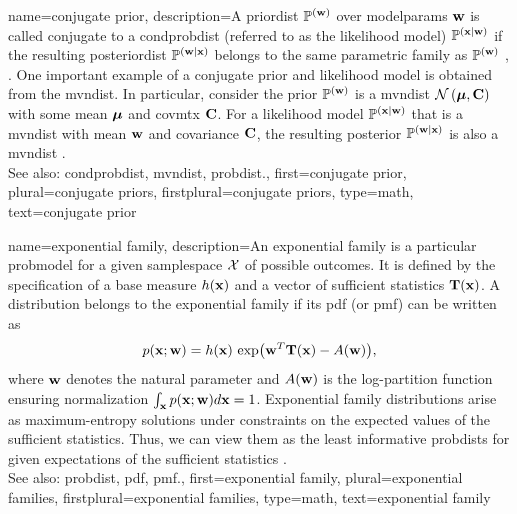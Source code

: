  {name={conjugate prior},
 	description={A \gls{priordist} $\mathbb{P}^{({\bf w})}$ over \glspl{modelparam} 
 		${\bf w}$ is called conjugate to a \gls{condprobdist} (referred to as the 
		likelihood \gls{model}) $\mathbb{P}^{({\bf x}\mid{\bf w})}$ if the resulting 
 		\gls{posteriordist} $\mathbb{P}^{({\bf w} \mid{\bf x})}$ belongs to 
 		the same parametric family as $\mathbb{P}^{({\bf w})}$ \cite{barber2012bayesian}, \cite{BishopBook}. 
 		One important example of a conjugate prior and likelihood \gls{model} is 
 		obtained from the \gls{mvndist}. In particular, consider the prior $\mathbb{P}^{({\bf w})}$ 
 		is a \gls{mvndist} $\mathcal{N}\left({\bm \mu},{\bf C}\right)$ with some 
 		\gls{mean} ${\bm \mu}$ and \gls{covmtx} ${\bf C}$. For a 
 		likelihood \gls{model} $\mathbb{P}^{({\bf x}\mid{\bf w})}$ that is a \gls{mvndist} 
 		with \gls{mean} ${\bf w}$ and \gls{covariance} ${\bf C}$, the resulting \gls{posterior} 
 		$\mathbb{P}^{({\bf w} \mid{\bf x})}$ is also a \gls{mvndist} \cite[Appendix B]{BishopBook}.
		\\
 		See also: \gls{condprobdist}, \gls{mvndist}, \gls{probdist}.},
 	first={conjugate prior},
 	plural={conjugate priors},
 	firstplural={conjugate priors},
 	type=math,
 	text={conjugate prior}
 }

{name={exponential family},
	description={An exponential family is a particular \gls{probmodel} 
		for a given \gls{samplespace} $\mathcal{X}$ of possible \glspl{outcome}. It 
		is defined by the specification of a base \gls{measure} $h({\bf x})$ and 
		a \gls{vector} of sufficient statistics $\mathbf{T}({\bf x})$. 
		A distribution belongs to the exponential family if its \gls{pdf} (or \gls{pmf})
		can be written as 
		\[ p({\bf x} ;  {\bf w}) = h({\bf x})\,\exp\!\big({\bf w}^{T} \mathbf{T}({\bf x}) - A({\bf w})\big),
  		\]
  		where ${\bf w}$ denotes the natural \gls{parameter} and $A({\bf w})$ is the log-partition 
       		\gls{function} ensuring normalization $\int_{{\bf x}} p({\bf x} ;  {\bf w}) d{\bf x} = 1$.
  		Exponential family distributions arise as \gls{maximum}-\gls{entropy} solutions under constraints 
		on the expected values of the sufficient statistics. Thus, we can view them 
		as the least informative \glspl{probdist} for given \glspl{expectation} of the sufficient 
		statistics \cite[Ch. 12]{coverthomas}. 
		\\ 
		See also: \gls{probdist}, \gls{pdf}, \gls{pmf}.},
	first={exponential family},
	plural={exponential families},
	firstplural={exponential families},
	type=math,
	text={exponential family}
}

